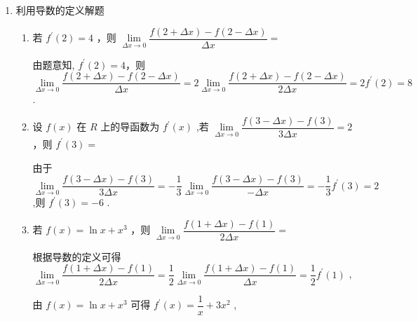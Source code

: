 \begin{enumerate}
    \item 利用导数的定义解题
    \begin{enumerate}
        \item 若 ${f}^{\prime }\left( 2\right)  = 4$ ，则 $\mathop{\lim }\limits_{{{\Delta x} \rightarrow  0 }}\dfrac{f\left( {2 + {\Delta x}}\right)  - f\left( {2 - {\Delta x}}\right) }{\Delta x} =$ 
        \begin{jieda}
            由题意知, ${f}^{\prime }\left( 2\right)  = 4$，则 $\mathop{\lim }\limits_{{{\Delta x} \rightarrow  0 }}\dfrac{f\left( {2 + {\Delta x}}\right)  - f\left( {2 - {\Delta x}}\right) }{\Delta x} = 2\mathop{\lim }\limits_{{{\Delta x} \rightarrow  0 }}\dfrac{f\left( {2 + {\Delta x}}\right)  - f\left( {2 - {\Delta x}}\right) }{2\Delta x} = 2{f}^{\prime }\left( 2\right)  = 8$ .
        \end{jieda}
        
        \item 设 $f\left( x\right)$ 在 $R$ 上的导函数为 ${f}^{\prime }\left( x\right)$ ,若 $\mathop{\lim }\limits_{{{\Delta x} \rightarrow  0 }}\dfrac{f\left( {3 - {\Delta x}}\right)  - f\left( 3\right) }{3\Delta x} = 2$，则 ${f}^{\prime }\left( 3\right)  =$
        \begin{jieda}
            由于 $\mathop{\lim }\limits_{{{\Delta x} \rightarrow  0 }}\dfrac{f\left( {3 - {\Delta x}}\right)  - f\left( 3\right) }{3\Delta x} =  - \dfrac{1}{3}\mathop{\lim }\limits_{{{\Delta x} \rightarrow  0 }}\dfrac{f\left( {3 - {\Delta x}}\right)  - f\left( 3\right) }{-{\Delta x}} =  - \dfrac{1}{3}{f}^{\prime }\left( 3\right)  = 2$ ,则 ${f}^{\prime }\left( 3\right)  =  - 6$ .
        \end{jieda}
        
        \item 若 $f\left( x\right)  = \ln x + {x}^{3}$ ，则 $\mathop{\lim }\limits_{{{\Delta x} \rightarrow  0 }}\dfrac{f\left( {1 + {\Delta x}}\right)  - f\left( 1\right) }{2\Delta x} =$
        \begin{jieda}
            根据导数的定义可得 $\mathop{\lim }\limits_{{{\Delta x} \rightarrow  0 }}\dfrac{f\left( {1 + {\Delta x}}\right)  - f\left( 1\right) }{2\Delta x} = \dfrac{1}{2}\mathop{\lim }\limits_{{{\Delta x} \rightarrow  0 }}\dfrac{f\left( {1 + {\Delta x}}\right)  - f\left( 1\right) }{\Delta x} = \dfrac{1}{2}{f}^{\prime }\left( 1\right)$ ,
            
            由 $f\left( x\right)  = \ln x + {x}^{3}$ 可得 ${f}^{\prime }\left( x\right)  = \dfrac{1}{x} + 3{x}^{2}$ ,
            

\end{jieda}
\end{enumerate}
\end{enumerate}

